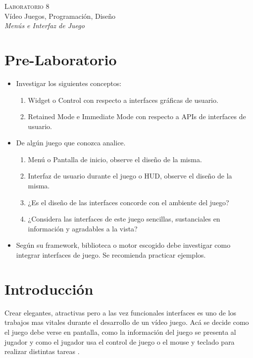 \begin{center}
\textsc{\Large Laboratorio 8}~\\
{\large Vídeo Juegos, Programación, Diseño}~\\
\emph{Menús e Interfaz de Juego}
\end{center}

\section{Pre-Laboratorio}
\begin{itemize}
\item Investigar los siguientes conceptos:
\begin{enumerate}
  \item Widget o Control con respecto a interfaces gráficas de usuario.
  \item Retained Mode e Immediate Mode con respecto a APIs de interfaces de usuario.
\end{enumerate}
\item De algún juego que conozca analice.
\begin{enumerate}
  \item Menú o Pantalla de inicio, observe el diseño de la misma.
  \item Interfaz de usuario durante el juego o HUD, observe el diseño de la misma.
  \item ¿Es el diseño de las interfaces concorde con el ambiente del juego?
  \item ¿Considera las interfaces de este juego sencillas, sustanciales en información y agradables a la vista?
\end{enumerate}
\item Según su framework, biblioteca o motor escogido debe investigar como integrar interfaces de juego. Se recomienda practicar ejemplos.
\end{itemize}

\section{Introducción}
Crear elegantes, atractivas pero a las vez funcionales interfaces es uno de los trabajos mas vitales durante el desarrollo de un vídeo juego. Acá se decide como el juego debe verse en pantalla, como la información del juego se presenta al jugador y como el jugador usa el control de juego o el mouse y teclado para realizar distintas tareas \cite[p.~26]{jenkinscreatinggames}.

